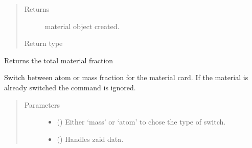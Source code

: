 \documentclass[letterpaper,10pt,english]{sphinxmanual}
\begin{document}
\begin{fulllineitems}
\begin{fulllineitems}
\begin{quote}
\begin{description}
\begin{itemize}
\end{itemize}

\item[{Returns}] \leavevmode
\sphinxAtStartPar
material object created.

\item[{Return type}] \leavevmode
\sphinxAtStartPar
{\hyperref[\detokenize{api/inputgeneration:matreader.Material}]{}}

\end{description}\end{quote}

\end{fulllineitems}


\begin{fulllineitems}
\label{\detokenize{api/inputgeneration:matreader.Material.get_tot_fraction}}
\sphinxAtStartPar
Returns the total material fraction

\end{fulllineitems}


\begin{fulllineitems}
\label{\detokenize{api/inputgeneration:matreader.Material.switch_fraction}}
\sphinxAtStartPar
Switch between atom or mass fraction for the material card.
If the material is already switched the command is ignored.
\begin{quote}\begin{description}
\item[{Parameters}] \leavevmode\begin{itemize}
\item {} 
\sphinxAtStartPar
{} () \textendash{} Either ‘mass’ or ‘atom’ to chose the type of switch.

\item {} 
\sphinxAtStartPar
{} ({\hyperref[\detokenize{api/initobjects:libmanager.LibManager}]{}}) \textendash{} Handles zaid data.


\end{itemize}
\end{description}
\end{quote}
\end{fulllineitems}
\end{fulllineitems}
\end{document}
